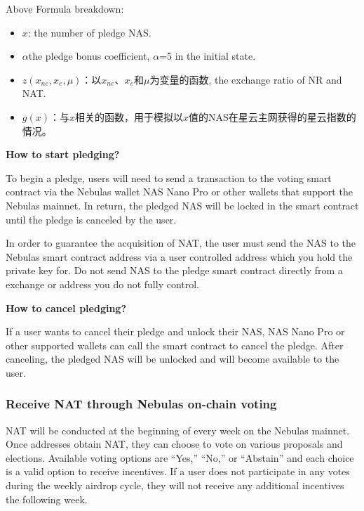 Above Formula breakdown:

\begin{itemize}
	\item $x$: the number of pledge NAS.
	\item $\alpha$the pledge bonus coefficient, $\alpha$=5 in the initial state.
	\item $z(x_{ne},x_{e},\mu)$：以$x_{ne}$、$x_{e}$和$\mu$为变量的函数, the exchange ratio of NR and NAT.
	\item $g(x)$：与$x$相关的函数，用于模拟以$x$值的NAS在星云主网获得的星云指数的情况。
\end{itemize}

\vspace{2em}

\textbf{How to start pledging?} 
	
To begin a pledge, users will need to send a transaction to the voting smart contract via the Nebulas wallet NAS Nano Pro or other wallets that support the Nebulas mainnet. In return, the pledged NAS will be locked in the smart contract until the pledge is canceled by the user.

In order to guarantee the acquisition of NAT, the user must send the NAS to the Nebulas smart contract address via a user controlled address which you hold the private key for. Do not send NAS to the pledge smart contract directly from a exchange or address you do not fully control.

\vspace{2em}

\textbf{How to cancel pledging?}

If a user wants to cancel their pledge and unlock their NAS, NAS Nano Pro or other supported wallets can call the smart contract to cancel the pledge. After canceling, the pledged NAS will be unlocked and will become available to the user.

\subsubsection{Receive NAT through Nebulas on-chain voting}

NAT will be conducted at the beginning of every week on the Nebulas mainnet. Once addresses obtain NAT, they can choose to vote on various proposals and elections. Available voting options are “Yes,” “No,” or “Abstain” and each choice is a valid option to receive incentives. If a user does not participate in any votes during the weekly airdrop cycle, they will not receive any additional incentives the following week.

